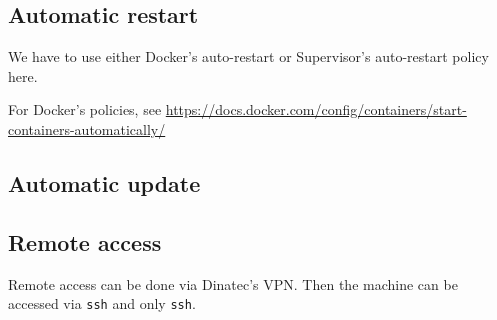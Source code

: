 \subsection{Automatic restart}


We have to use either Docker's auto-restart or Supervisor's auto-restart policy here.

For Docker's policies, see \url{https://docs.docker.com/config/containers/start-containers-automatically/}


\subsection{Automatic update}




\subsection{Remote access}

Remote access can be done via Dinatec's VPN. Then the machine can be accessed via \texttt{ssh} and only \texttt{ssh}.

